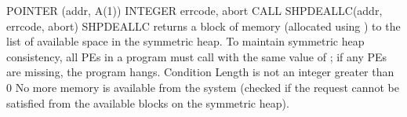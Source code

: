 \synF   %
POINTER (addr, A(1))
INTEGER errcode, abort
CALL SHPDEALLC(addr, errcode, abort)
 {
       SHPDEALLC  returns  a block of memory (allocated using ) to the
       list of available space in the symmetric heap.  To  maintain  symmetric
       heap  consistency, all \ac{PE}s in a program must call
        with the same value of ; if  any \ac{PE}s  are missing, the
       program hangs.
  }
{
\desR{ }
 {Condition}
 {Length is not an integer greater than 0}
 { No more memory is available from the system (checked if the  request  cannot  be	satisfied from the available blocks on the symmetric heap).}
}%
\eAPI 